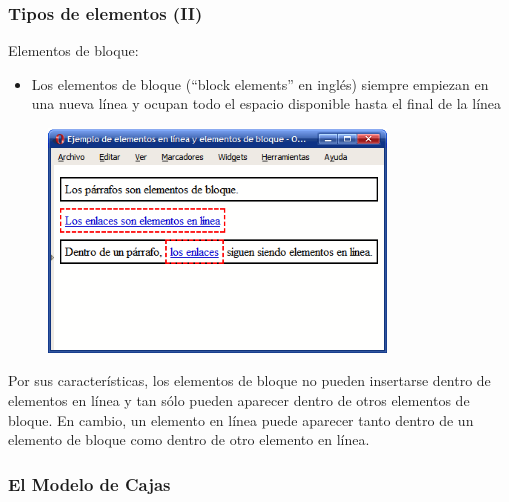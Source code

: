 \documentclass[ucs]{beamer}
\begin{document}

\begin{frame}
\frametitle{Tipos de elementos (II)}

Elementos de bloque:

\begin{itemize}
  \item Los elementos de bloque (``block elements'' en inglés) siempre empiezan en una nueva línea y ocupan todo el espacio disponible hasta el final de la línea
\end{itemize}

\begin{center}
\begin{figure}[p]
\includegraphics[width=0.8\textwidth]{figs/f0501.png}
\end{figure}
\end{center}

Por sus características, los elementos de bloque no pueden insertarse dentro de elementos en línea y tan sólo pueden aparecer dentro de otros elementos de bloque. En cambio, un elemento en línea puede aparecer tanto dentro de un elemento de bloque como dentro de otro elemento en línea.

\end{frame}




\subsubsection*{El Modelo de Cajas}
\end{document}
